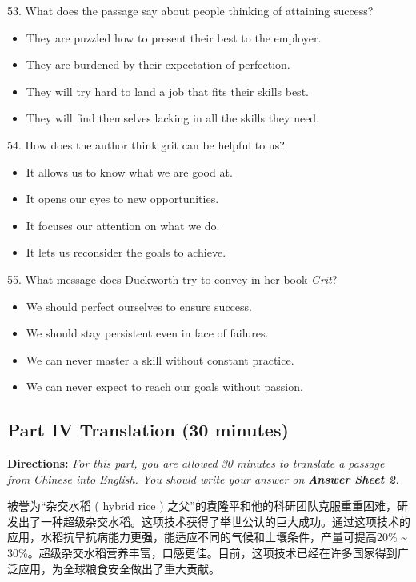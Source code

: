 \documentclass[UTF8,11pt]{ctexart}
\begin{document}
53. What does the passage say about people thinking of attaining success?


\begin{itemize}[leftmargin=2em,itemsep=.2em,topsep=.4em]\item[A.] They are puzzled how to present their best to the employer.
\item[B.] They are burdened by their expectation of perfection.
\item[C.] They will try hard to land a job that fits their skills best.
\item[D.] They will find themselves lacking in all the skills they need.
\end{itemize}

54. How does the author think grit can be helpful to us?


\begin{itemize}[leftmargin=2em,itemsep=.2em,topsep=.4em]\item[A.] It allows us to know what we are good at.
\item[B.] It opens our eyes to new opportunities.
\item[C.] It focuses our attention on what we do.
\item[D.] It lets us reconsider the goals to achieve.
\end{itemize}

55. What message does Duckworth try to convey in her book \textit{Grit}?


\begin{itemize}[leftmargin=2em,itemsep=.2em,topsep=.4em]\item[A.] We should perfect ourselves to ensure success.
\item[B.] We should stay persistent even in face of failures.
\item[C.] We can never master a skill without constant practice.
\item[D.] We can never expect to reach our goals without passion.
\end{itemize}

\subsection*{\textbf{Part IV Translation (30 minutes)}}


\textbf{Directions: }\textit{For this part, you are allowed 30 minutes to translate a passage from Chinese into English. You} \textit{should write your answer on }\textbf{\textit{Answer Sheet 2}}\textit{.}


被誉为“杂交水稻 ( hybrid rice ) 之父”的袁隆平和他的科研团队克服重重困难，研发出了一种超级杂交水稻。这项技术获得了举世公认的巨大成功。通过这项技术的应用，水稻抗旱抗病能力更强，能适应不同的气候和土壤条件，产量可提高20\% \textasciitilde{} 30\%。超级杂交水稻营养丰富，口感更佳。目前，这项技术已经在许多国家得到广泛应用，为全球粮食安全做出了重大贡献。
\end{document}

